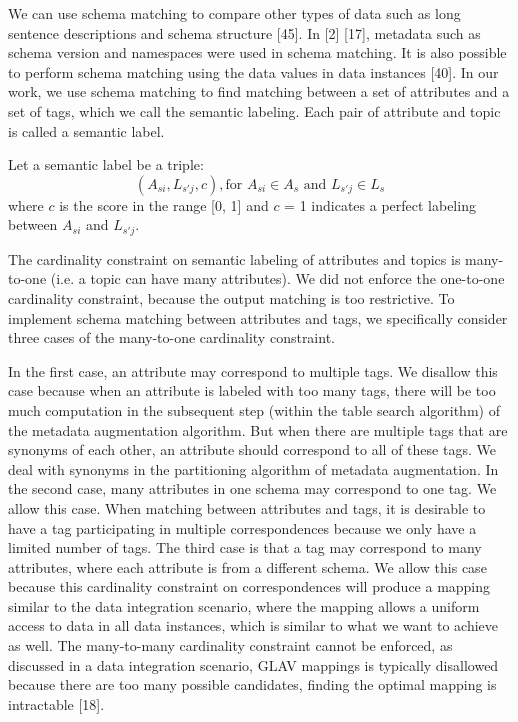 We can use schema matching to compare other types of data such as long sentence descriptions and schema structure \cite{Sorrentino2011NORMS}[45]. In \cite{10.1145/1066157.1066283}[2] \cite{Duchateau2009YAM}[17], metadata such as schema version and namespaces were used in schema matching. It is also possible to perform schema matching using the data values in data instances \cite{Rahm2001Survey}[40]. In our work, we use schema matching to find matching between a set of attributes and a set of tags, which we call the semantic labeling. Each pair of attribute and topic is called a semantic label.

Let a semantic label be a triple: 
\[
(A_{si},L_{s'j},c),\text{for }A_{si}\in A_{s}\text{ and }L_{s'j}\in L_{s}
\]
where $c$ is the score in the range {[}0, 1{]} and $c$ = 1 indicates a perfect labeling between $A_{si}$ and $L_{s'j}$.

The cardinality constraint on semantic labeling of attributes and topics is many-to-one (i.e. a topic can have many attributes). We did not enforce the one-to-one cardinality constraint, because the output matching is too restrictive. To implement schema matching between attributes and tags, we specifically consider three cases of the many-to-one cardinality constraint.

In the first case, an attribute may correspond to multiple tags. We disallow this case because when an attribute is labeled with too many tags, there will be too much computation in the subsequent step (within the table search algorithm) of the metadata augmentation algorithm. But when there are multiple tags that are synonyms of each other, an attribute should correspond to all of these tags. We deal with synonyms in the partitioning algorithm of metadata augmentation. In the second case, many attributes in one schema may correspond to one tag. We allow this case. When matching between attributes and tags, it is desirable to have a tag participating in multiple correspondences because we only have a limited number of tags. The third case is that a tag may correspond to many attributes, where each attribute is from a different schema. We allow this case because this cardinality constraint on correspondences will produce a mapping similar to the data integration scenario, where the mapping allows a uniform access to data in all data instances, which is similar to what we want to achieve as well. The many-to-many cardinality constraint cannot be enforced, as discussed in a data integration scenario, GLAV mappings is typically disallowed because there are too many possible candidates, finding the optimal mapping is intractable \cite{Ehrig2004QOM}[18].

